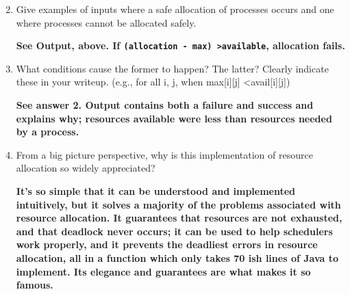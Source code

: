 \documentclass[11pt]{article}
\begin{document}
\begin{enumerate}
\setcounter{enumi}{1}

\item Give examples of inputs where a safe allocation of processes occurs and one where processes cannot be allocated safely.

\textbf{See Output, above. If \texttt{(allocation - max) \textgreater available}, allocation fails.}

\item What conditions cause the former to happen? The latter? Clearly indicate these in your writeup. (e.g., for all i, j, when max[i][j] \textless avail[i][j])

\textbf{See answer 2. Output contains both a failure and success and explains why; resources available were less than resources needed by a process.}

\item From a big picture perspective, why is this implementation of resource allocation so widely appreciated?

\textbf{It's so simple that it can be understood and implemented intuitively, but it solves a majority of the problems associated with resource allocation. It guarantees that resources are not exhausted, and that deadlock never occurs; it can be used to help schedulers work properly, and it prevents the deadliest errors in resource allocation, all in a function which only takes 70 ish lines of Java to implement. Its elegance and guarantees are what makes it so famous.}

\end{enumerate}
\end{document}
